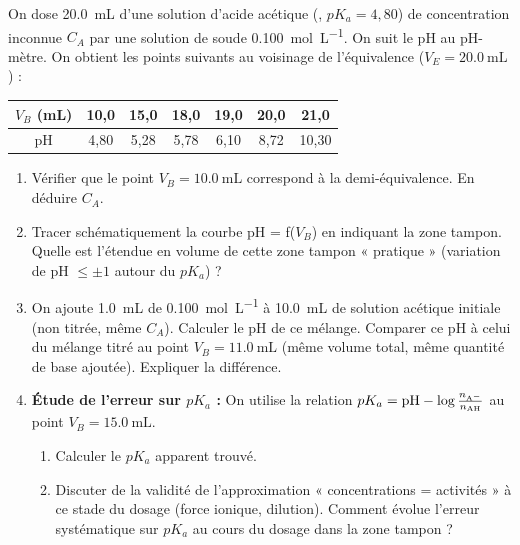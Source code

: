 \documentclass[11pt]{article}
\begin{document}
\begin{exercice}
On dose \SI{20,0}{\milli\liter} d'une solution d'acide acétique (, $pK_a = 4,80$) de concentration inconnue $C_A$ par une solution de soude \SI{0,100}{\mol\per\liter}. On suit le pH au pH-mètre. On obtient les points suivants au voisinage de l'équivalence ($V_E = \SI{20,0}{\milli\liter}$) :
\begin{center}
\begin{tabular}{c|cccccc}
$V_B$ (\si{\milli\liter}) & 10,0 & 15,0 & 18,0 & 19,0 & 20,0 & 21,0 \\
\hline
pH & 4,80 & 5,28 & 5,78 & 6,10 & 8,72 & 10,30
\end{tabular}
\end{center}
\begin{enumerate}
    \item Vérifier que le point $V_B = \SI{10,0}{\milli\liter}$ correspond à la demi-équivalence. En déduire $C_A$.
    \item Tracer schématiquement la courbe pH = f($V_B$) en indiquant la zone tampon. Quelle est l'étendue en volume de cette zone tampon « pratique » (variation de pH $\le \pm 1$ autour du $pK_a$) ?
    \item On ajoute \SI{1,0}{\milli\liter} de  \SI{0,100}{\mol\per\liter} à \SI{10,0}{\milli\liter} de solution acétique initiale (non titrée, même $C_A$). Calculer le pH de ce mélange. Comparer ce pH à celui du mélange titré au point $V_B = \SI{11,0}{\milli\liter}$ (même volume total, même quantité de base ajoutée). Expliquer la différence.
    \item \textbf{Étude de l'erreur sur $pK_a$ :} On utilise la relation $pK_a = \text{pH} - \log\frac{n_{\ce{A-}}}{n_{\ce{AH}}}$ au point $V_B = \SI{15,0}{\milli\liter}$. 
    \begin{enumerate}
        \item Calculer le $pK_a$ apparent trouvé.
        \item Discuter de la validité de l'approximation « concentrations = activités » à ce stade du dosage (force ionique, dilution). Comment évolue l'erreur systématique sur $pK_a$ au cours du dosage dans la zone tampon ?
    \end{enumerate}
\end{enumerate}
\end{exercice}
\end{document}
